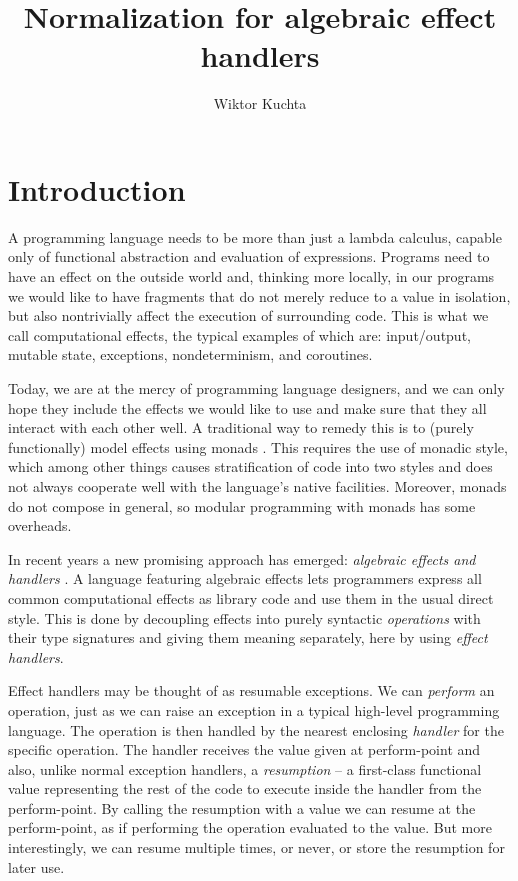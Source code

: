 \documentclass[a4paper, 12pt]{report}
\title{Normalization for algebraic effect handlers}
\author{Wiktor Kuchta}
\date{\vspace{-4ex}}
\newcommand{\+}{\enspace}
\begin{document}
\maketitle

\chapter{Introduction}
A programming language needs to be more than just a lambda calculus,
capable only of functional abstraction and evaluation of expressions.
Programs need to have an effect on the outside world and, thinking more locally,
in our programs we would like to have fragments that do not merely reduce to a value in isolation,
but also nontrivially affect the execution of surrounding code.
This is what we call computational effects, the typical examples of which are:
input/output, mutable state, exceptions, nondeterminism, and coroutines.

Today, we are at the mercy of programming language designers,
and we can only hope they include the
effects we would like to use and make sure that they all interact with
each other well.
A traditional way to remedy this is to (purely functionally) model effects using monads \cite{monads}.
This requires the use of monadic style, which among other things causes
stratification of code into two styles and does not always cooperate well with
the language's native facilities.
Moreover, monads do not compose in general, so modular programming with monads has some overheads.

In recent years a new promising approach has emerged: \textit{algebraic effects and handlers} \cite{Plotkin_2013}.
A language featuring algebraic effects lets programmers express all common computational effects as library code
and use them in the usual direct style.
This is done by decoupling effects into purely syntactic {\em operations} with their type signatures
and giving them meaning separately, here by using {\em effect handlers}.

Effect handlers may be thought of as resumable exceptions.
We can \textit{perform} an operation,
just as we can raise an exception in a typical high-level programming language.
The operation is then handled by the nearest enclosing \textit{handler} for the specific operation.
The handler receives the value given at perform-point and also,
unlike normal exception handlers,
a \textit{resumption} – a first-class functional value representing the rest
of the code to execute inside the handler from the perform-point.
By calling the resumption with a value we can resume at the perform-point,
as if performing the operation evaluated to the value.
But more interestingly, we can resume multiple times, or never, or store the resumption for later use.
\end{document}
